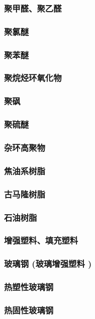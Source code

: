 \documentclass[UTF8]{../../ApplicationUniverse}
\begin{document}
        \subsubsection{聚甲醛、聚乙醛}
        \subsubsection{聚氯醚}
        \subsubsection{聚苯醚}
        \subsubsection{聚烷烃环氧化物}
        \subsubsection{聚砜}
        \subsubsection{聚硫醚}
    \subsubsection{杂环高聚物}
    \subsubsection{焦油系树脂}
        \subsubsection{古马隆树脂}
        \subsubsection{石油树脂}

\subsubsection{增强塑料、填充塑料}
    \subsubsection{玻璃钢 (玻璃增强塑料 )}
        \subsubsection{热塑性玻璃钢}
        \subsubsection{热固性玻璃钢}
\end{document}
